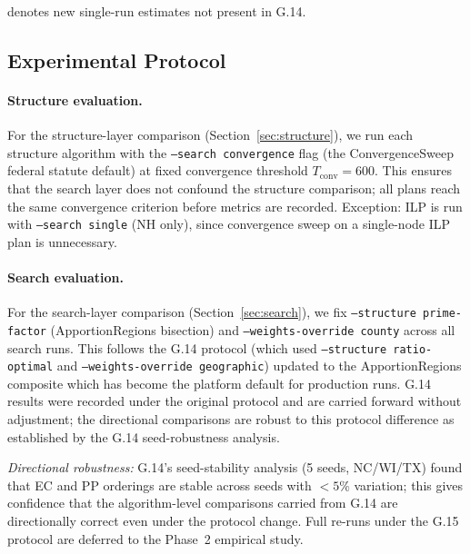 \dag{} denotes new single-run estimates not present in G.14.

\subsection{Experimental Protocol}

\paragraph{Structure evaluation.}
For the structure-layer comparison (Section~\ref{sec:structure}), we run each
structure algorithm with the \texttt{--search convergence} flag (the
ConvergenceSweep federal statute default) at fixed convergence threshold
$T_{\mathrm{conv}} = 600$.
This ensures that the search layer does not confound the structure comparison;
all plans reach the same convergence criterion before metrics are recorded.
Exception: ILP is run with \texttt{--search single} (NH only), since
convergence sweep on a single-node ILP plan is unnecessary.

\paragraph{Search evaluation.}
For the search-layer comparison (Section~\ref{sec:search}), we fix
\texttt{--structure prime-factor} (ApportionRegions bisection) and
\texttt{--weights-override county} across all search runs.
This follows the G.14 protocol (which used \texttt{--structure ratio-optimal}
and \texttt{--weights-override geographic}) updated to the ApportionRegions composite
which has become the platform default for production runs.
G.14 results were recorded under the original protocol and are carried forward
without adjustment; the directional comparisons are robust to this protocol
difference as established by the G.14 seed-robustness analysis.

\textit{Directional robustness:} G.14's seed-stability analysis (5 seeds,
NC/WI/TX) found that EC and PP orderings are stable across seeds with
${<}5\%$ variation; this gives confidence that the algorithm-level comparisons
carried from G.14 are directionally correct even under the protocol change.
Full re-runs under the G.15 protocol are deferred to the Phase~2 empirical
study.

